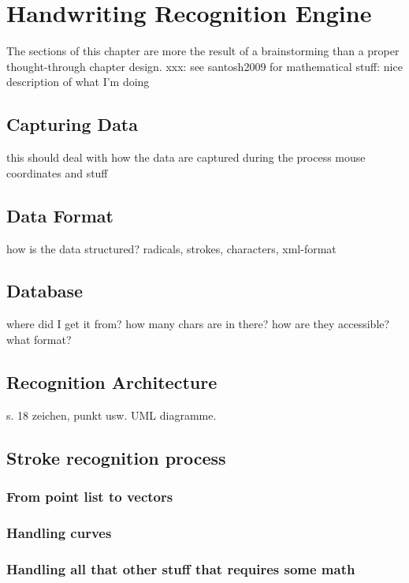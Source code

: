 
\chapter{Handwriting Recognition Engine}
\label{chap:handwritingrecognitionengine}
The sections of this chapter are more the result of a brainstorming 
than a  proper thought-through chapter design.
xxx: see santosh2009 for mathematical stuff: nice description of what I'm doing

\section{Capturing Data}
this should deal with how the data are captured during the process
mouse coordinates and stuff

\section{Data Format}
how is the data structured? radicals, strokes, characters, xml-format

\section{Database}
where did I get it from? how many chars are in there?
how are they accessible? what format?

\section{Recognition Architecture}

s. 18 zeichen, punkt usw. UML diagramme.


\section{Stroke recognition process}
\subsection{From point list to vectors}
\subsection{Handling curves}
\subsection{Handling all that other stuff that requires some math}


